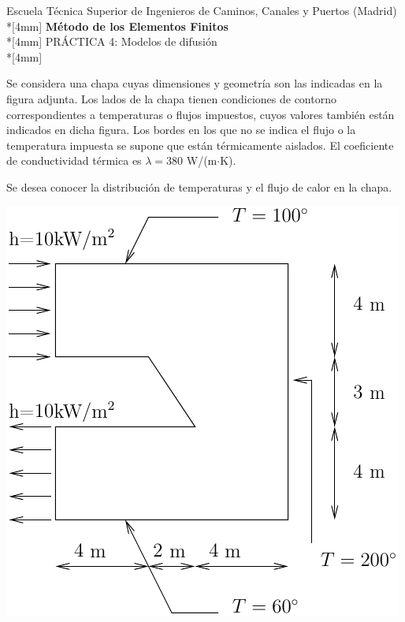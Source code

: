 \documentclass[a4paper,12pt]{article}
\begin{document}
\mbox{}\vspace*{-45mm}

{\centering
{\small\sc Escuela Técnica Superior de Ingenieros de Caminos, Canales y
Puertos (Madrid)}\\*[4mm]
{\Large\bf Método de los Elementos Finitos}\\*[4mm]
PRÁCTICA 4: Modelos de difusión \\*[4mm]
}

\vspace{3mm}

\parbox{70mm}{ 
Se considera una chapa cuyas dimensiones y geometría son las indicadas
en la figura adjunta. Los lados de la chapa tienen condiciones de contorno 
correspondientes a temperaturas o flujos impuestos, cuyos valores
también están indicados en dicha figura. Los bordes en los que no se indica
el flujo o la temperatura impuesta se supone que están térmicamente aislados.
El coeficiente de conductividad térmica es $\lambda=380$ W/(m$\cdot$K).

Se desea conocer la distribución de temperaturas y el flujo de calor en la
chapa.
} \hfill
\parbox{80mm}{
\includegraphics{practi4}
}
\end{document}
